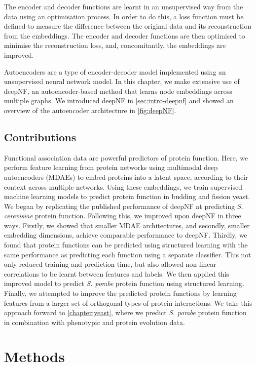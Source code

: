 The encoder and decoder functions are learnt in an unsupervised way from the data using an optimisation process.
In order to do this, a loss function must be defined to measure the difference between the original data and its reconstruction from the embeddings.
The encoder and decoder functions are then optimised to minimise the reconstruction loss, and,
concomitantly, the embeddings are improved.

Autoencoders are a type of encoder-decoder model implemented using an unsupervised neural network model.
In this chapter, we make extensive use of deepNF, an autoencoder-based method that learns node embeddings across multiple graphs.
We introduced deepNF in \ref{sec:intro-deepnf} and showed an overview of the autoencoder architecture in \ref{fig:deepNF}.

\subsection{Contributions}

Functional association data are powerful predictors of protein function.
Here, we perform feature learning from protein networks using multimodal deep autoencoders (MDAEs) to embed proteins into a latent space, according to their context across multiple networks.
Using these embeddings, we train supervised machine learning models to predict protein function in budding and fission yeast.
We began by replicating the published performance of deepNF \cite{Gligorijevic2018} at predicting \emph{S. cerevisiae} protein function.
Following this, we improved upon deepNF in three ways.
Firstly, we showed that smaller MDAE architectures, and secondly, smaller embedding dimensions, achieve comparable performance to deepNF.
Thirdly, we found that protein functions can be predicted using structured learning with the same performance as predicting each function using a separate classifier.
This not only reduced training and prediction time, but also allowed non-linear correlations to be learnt between features and labels.
We then applied this improved model to predict \emph{S. pombe} protein function using structured learning.
Finally, we attempted to improve the predicted protein functions by learning features from a larger set of orthogonal types of protein interactions.
We take this approach forward to \ref{chapter:yeast}, where we predict \emph{S. pombe} protein function in combination with phenotypic and protein evolution data.


\section{Methods}

